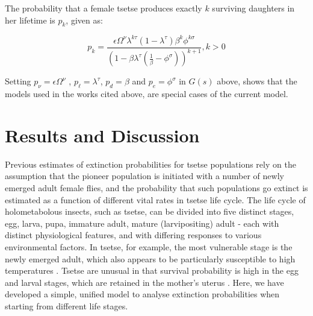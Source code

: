 \documentclass[smallextended]{svjour3}
\begin{document}
The probability that a female tsetse produces exactly $k$ surviving daughters in her lifetime is $p_{k}$, given as:

\begin{equation}
	\label{Johnframework}
	p_{k}= \frac{\epsilon \Omega^{\nu}\lambda^{k\tau}(1-\lambda^{\tau})\beta^{k}\phi^{k\sigma}}{(1-\beta \lambda^\tau(\frac{1}{\beta} -\phi^{\sigma}))^{k+1}},   k>0   
\end{equation}

Setting  $ p_{\nu}= \epsilon \Omega^{\nu}$ , $p_{\ell} =\lambda^{\tau} $, $p_{d}=\beta$  and $p_{e} = \phi^{\sigma} $ in  $G(s)$ above,   shows that the models used in the works cited above, are special cases of the current model. 

\section{Results and Discussion}
\label{section8}

Previous estimates of extinction probabilities for tsetse populations rely on the assumption that the pioneer population is initiated with a number of newly emerged adult female flies, and the probability that such populations go extinct is estimated as a function of different vital rates in tsetse life cycle. The life cycle of holometabolous insects, such as tsetse, can be divided into five distinct stages, egg, larva, pupa, immature adult, mature (larvipositing) adult - each with distinct physiological features, and with differing responses to various environmental factors. In tsetse, for example, the most vulnerable stage is the newly emerged adult, which also appears to be particularly susceptible to high temperatures \cite{Ackley2017a}. Tsetse are unusual in that survival probability is high in the egg and larval stages, which are retained in the mother's uterus \cite{Hargrove1999a}. Here, we have developed a simple, unified model to analyse extinction probabilities when starting from different life stages. 
\end{document}
